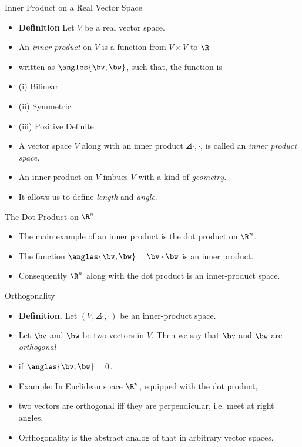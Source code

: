 \documentclass{beamer}
\begin{document}
\begin{frame}{Inner Product on a Real Vector Space}

\begin{itemize}
\item \textbf{Definition} Let $V$ be a real vector space.
\item An \emph{inner product} on $V$ is a function from $V\times V$ to $\R$
\item written as $\angles{\bv,\bw}$, such that, the function is
\item (i) Bilinear
\item (ii) Symmetric
\item (iii) Positive Definite
\item A vector space $V$ along with an inner product $\angles{\cdot, \cdot}$, is
called an \emph{inner product space.}
\item An inner product on $V$ imbues $V$ with a kind of \emph{geometry.}
\item It allows us to define \emph{length} and \emph{angle}.
\end{itemize}
\end{frame}


\begin{frame}{The Dot Product on  $\R^n$}

\begin{itemize}
\item The main example of an inner product is the dot product on $\R^n$.
\item The function $\angles{\bv,\bw} = \bv\cdot\bw$ is an inner product.
\item Consequently $\R^n$ along with the dot product is an inner-product space.
\end{itemize}
\end{frame}

\begin{frame}{Orthogonality}

\begin{itemize}
\item \textbf{Definition.} Let $\left(V, \angles{\cdot,\cdot}\right)$ be an inner-product space.
\item Let $\bv$ and $\bw$ be two vectors in $V$. Then we say that $\bv$ and $\bw$ are \emph{orthogonal}
\item if $\angles{\bv,\bw}=0$.
\item Example: In Euclidean space $\R^n$, equipped with the dot product,
\item two vectors are orthogonal iff they are perpendicular, i.e. meet at right angles.
\item Orthogonality is the abstract analog of that in arbitrary vector spaces.
\end{itemize}
\end{frame}
\end{document}

